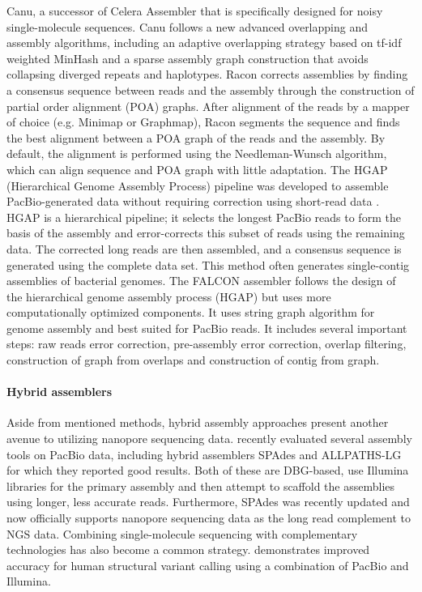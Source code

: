 Canu, a successor of Celera Assembler that is specifically designed for noisy single-molecule sequences. 
Canu follows a new advanced overlapping and assembly algorithms, including an adaptive overlapping strategy based on tf-idf weighted MinHash and a sparse assembly graph construction that avoids collapsing diverged repeats and haplotypes. 
Racon corrects assemblies by finding a consensus sequence between reads and the assembly through the construction of partial order alignment (POA) graphs. 
After alignment of the reads by a mapper of choice (e.g. Minimap or Graphmap), 
Racon segments the sequence and finds the best alignment between a POA graph of the reads and the assembly. 
By default, the alignment is performed using the Needleman-Wunsch algorithm, which can align sequence and POA graph with little adaptation.
The HGAP (Hierarchical Genome Assembly Process) pipeline
was developed to assemble PacBio-generated data without requiring correction using short-read
data \citep{chin2013nonhybrid}. HGAP is a hierarchical pipeline; it selects the longest PacBio reads to form the basis
of the assembly and error-corrects this subset of reads using the remaining data. The corrected
long reads are then assembled, and a consensus sequence is generated using the complete data
set. This method often generates single-contig assemblies of bacterial genomes.
The FALCON assembler follows the design of the hierarchical genome assembly process (HGAP) but uses more computationally optimized components.
It uses string graph algorithm for genome assembly and best suited for PacBio reads.
It includes several important steps: raw reads error correction, pre-assembly error correction, overlap filtering, construction of graph from overlaps and construction of contig from graph.
\paragraph{Hybrid assemblers}
Aside from mentioned methods, hybrid assembly approaches present another avenue to utilizing nanopore sequencing data. 
\cite{liao2015completing} recently evaluated several assembly tools on PacBio data, including hybrid assemblers SPAdes \cite{bankevich2012spades} and ALLPATHS-LG \citep{gnerre2011high} 
for which they reported good results. Both of these are DBG-based, use Illumina libraries for the primary assembly and then attempt to scaffold the assemblies using longer, less accurate reads. 
Furthermore, SPAdes was recently updated and now officially supports nanopore sequencing data as the long read complement to NGS data. 
Combining single-molecule sequencing with complementary technologies has also become a common strategy. \cite{fan2017hysa} demonstrates improved accuracy for human structural variant calling using a combination of PacBio and Illumina.
